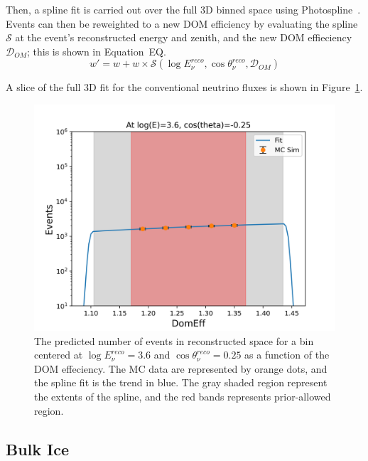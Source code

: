 \documentclass[main.tex]{subfiles}
\begin{document}
Then, a spline fit is carried out over the full 3D binned space using Photospline~\cite{WHITEHORN20132214}. 
Events can then be reweighted to a new DOM efficiency by evaluating the spline $\mathcal{S}$ at the event's reconstructed energy and zenith, and the new DOM effieciency $\mathcal{D}_{OM}$; this is shown in Equation~EQ.
\begin{equation}\label{eq:domeff}
    w' = w + w\times \mathcal{S}(\log E_{\nu}^{reco}, \cos\theta_{\nu}^{reco}, \mathcal{D}_{OM})
\end{equation}

A slice of the full 3D fit for the conventional neutrino fluxes is shown in Figure~\ref{fig:domeff_fit}.
\begin{figure}
    \centering
    \includegraphics[width=0.8\linewidth]{figures/atmConv_logE_3.6_cosz_-0.25.png}
    \caption{The predicted number of events in reconstructed space for a bin centered at $\log E_{\nu}^{reco}=3.6$ and $\cos\theta_{\nu}^{reco}=0.25$ as a function of the DOM effeciency. The MC data are represented by orange dots, and the spline fit is the trend in blue. The gray shaded region represent the extents of the spline, and the red bands represents prior-allowed region.}\label{fig:domeff_fit}
\end{figure}


\subsection{Bulk Ice}
\end{document}

